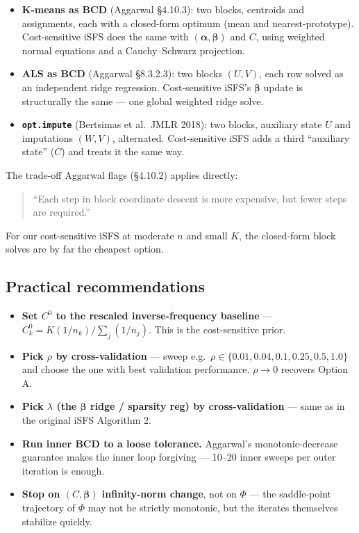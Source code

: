 \documentclass[11pt,a4paper]{article}
\begin{document}
\begin{itemize}[leftmargin=*,itemsep=2pt]
  \item \textbf{K-means as BCD} (Aggarwal \S 4.10.3): two blocks, centroids and assignments, each with a closed-form optimum (mean and nearest-prototype). Cost-sensitive iSFS does the same with $(\boldsymbol{\alpha}, \boldsymbol{\beta})$ and $C$, using weighted normal equations and a Cauchy--Schwarz projection.
  \item \textbf{ALS as BCD} (Aggarwal \S 8.3.2.3): two blocks $(U, V)$, each row solved as an independent ridge regression. Cost-sensitive iSFS's $\boldsymbol{\beta}$ update is structurally the same --- one global weighted ridge solve.
  \item \textbf{\texttt{opt.impute}} (Bertsimas et al.\ JMLR 2018): two blocks, auxiliary state $U$ and imputations $(W, V)$, alternated. Cost-sensitive iSFS adds a third ``auxiliary state'' ($C$) and treats it the same way.
\end{itemize}

The trade-off Aggarwal flags (\S 4.10.2) applies directly:

\begin{quote}
``Each step in block coordinate descent is more expensive, but fewer steps are required.''
\end{quote}

For our cost-sensitive iSFS at moderate $n$ and small $K$, the closed-form block solves are by far the cheapest option.

\subsection{Practical recommendations}

\begin{itemize}[leftmargin=*,itemsep=2pt]
  \item \textbf{Set $C^0$ to the rescaled inverse-frequency baseline} --- $C^0_k = K(1/n_k) / \sum_j(1/n_j)$. This is the cost-sensitive prior.
  \item \textbf{Pick $\rho$ by cross-validation} --- sweep e.g.\ $\rho \in \{0.01, 0.04, 0.1, 0.25, 0.5, 1.0\}$ and choose the one with best validation performance. $\rho \to 0$ recovers Option A.
  \item \textbf{Pick $\lambda$ (the $\boldsymbol{\beta}$ ridge / sparsity reg) by cross-validation} --- same as in the original iSFS Algorithm 2.
  \item \textbf{Run inner BCD to a loose tolerance.} Aggarwal's monotonic-decrease guarantee makes the inner loop forgiving --- 10--20 inner sweeps per outer iteration is enough.
  \item \textbf{Stop on $(C, \boldsymbol{\beta})$ infinity-norm change}, not on $\Phi$ --- the saddle-point trajectory of $\Phi$ may not be strictly monotonic, but the iterates themselves stabilize quickly.
\end{itemize}
\end{document}
